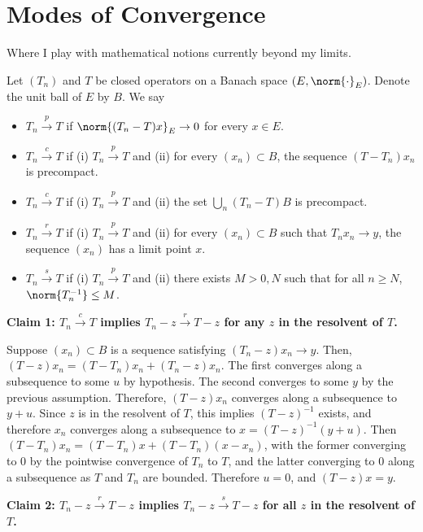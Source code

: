 \documentclass{article}
\newcommand{\1}{\mathbf{1}}
\theoremstyle{alden}
\theoremstyle{aldenthm}
\theoremstyle{definition}
\theoremstyle{remark}
\begin{document}
\section{Modes of Convergence}
\label{sec:modes_of_convergence}

Where I play with mathematical notions currently beyond my limits. 

Let $(T_n)$ and $T$ be closed operators on a Banach space $(E,\norm{\cdot}_E)$. Denote the unit ball of $E$ by $B$. We say 
\begin{itemize}
	\item $T_n \overset{p}{\to} T$ if $\norm{(T_n - T)x}_E \to 0$ for every $x \in E$. 
	\item $T_n \overset{c}{\to} T$ if (i) $T_n \overset{p}{\to} T$ and (ii) for every $(x_n) \subset B$, the sequence $(T - T_n)x_n$ is precompact.
	\item $T_n \overset{c}{\to} T$ if (i) $T_n \overset{p}{\to} T$ and (ii) the set $\bigcup_{n} (T_n - T)B$ is precompact.
	\item $T_n \overset{r}{\to} T$ if (i) $T_n \overset{p}{\to} T$ and (ii) for every $(x_n) \subset B$ such that $T_nx_{n} \to y$, the sequence $(x_{n})$ has a limit point $x$.
	\item $T_n \overset{s}{\to} T$ if (i) $T_n \overset{p}{\to} T$ and (ii) there exists $M > 0, N$ such that for all $n \geq N$, $\norm{T_n^{-1}} \leq M$. 
\end{itemize}

\textbf{Claim 1: $T_n \overset{c}{\to} T$ implies $T_n - z \overset{r}{\to} T - z$ for any $z$ in the resolvent of $T$.}

Suppose $(x_n) \subset B$ is a sequence satisfying $(T_n - z)x_n \to y$. Then, $(T - z)x_n = (T - T_n)x_n + (T_n - z)x_n$. The first converges along a subsequence to some $u$ by hypothesis. The second converges to some $y$ by the previous assumption. Therefore, $(T - z)x_n$ converges along a subsequence to $y + u$. Since $z$ is in the resolvent of $T$, this implies $(T - z)^{-1}$ exists, and therefore $x_n$ converges along a subsequence to $x = (T - z)^{-1}(y + u)$. Then $(T - T_n)x_n = (T - T_n)x + (T-T_n)(x - x_n)$, with the former converging to $0$ by the pointwise convergence of $T_n$ to $T$, and the latter converging to $0$ along a subsequence as $T$ and $T_n$ are bounded. Therefore $u = 0$, and $(T - z)x = y$.

\textbf{Claim 2: $T_n - z \overset{r}{\to} T - z$ implies $T_n - z \overset{s}{\to} T - z$ for all $z$ in the resolvent of $T$.}
\end{document}
